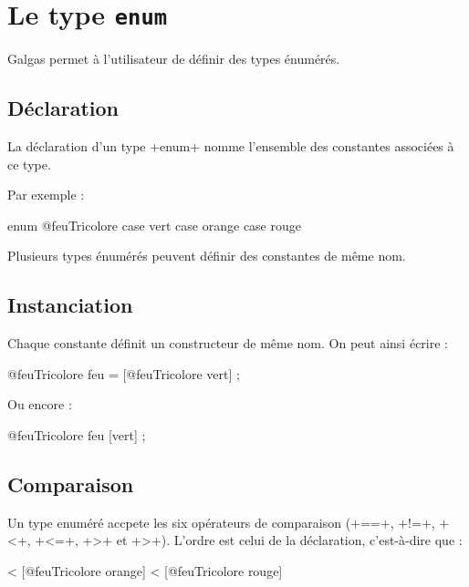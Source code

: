 
\chapter{Le type \texttt{enum}}

Galgas permet à l'utilisateur de définir des types énumérés.

\section{Déclaration}

La déclaration d'un type \ggs+enum+ nomme l'ensemble des constantes associées à ce type.

Par exemple :

\begin{galgascode}
enum @feuTricolore {
  case vert
  case orange
  case rouge
}
\end{galgascode}

Plusieurs types énumérés peuvent définir des constantes de même nom.

\section{Instanciation}

Chaque constante définit un constructeur de même nom. On peut ainsi écrire :

\begin{galgascode}
@feuTricolore feu = [@feuTricolore vert] ;
\end{galgascode}

Ou encore :

\begin{galgascode}
@feuTricolore feu [vert] ;
\end{galgascode}

\section{Comparaison}

Un type enuméré accpete les six opérateurs de comparaison (\ggs+==+, \ggs+!=+, \ggs+<+, \ggs+<=+, \ggs+>+ et \ggs+>+). L'ordre est celui de la déclaration, c'est-à-dire que :
\begin{galgascode}
   < [@feuTricolore orange] < [@feuTricolore rouge]
\end{galgascode}


